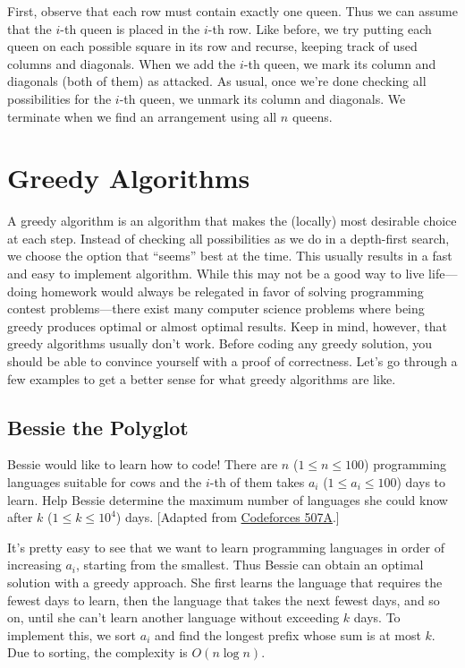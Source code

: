 First, observe that each row must contain exactly one queen. Thus we can assume that the $i$-th queen is placed in the $i$-th row. Like before, we try putting each queen on each possible square in its row and recurse, keeping track of used columns and diagonals. When we add the $i$-th queen, we mark its column and diagonals (both of them) as attacked. As usual, once we're done checking all possibilities for the $i$-th queen, we unmark its column and diagonals. We terminate when we find an arrangement using all $n$ queens.

\section{Greedy Algorithms}

A greedy algorithm is an algorithm that makes the (locally) most desirable choice at each step. Instead of checking all possibilities as we do in a depth-first search, we choose the option that ``seems'' best at the time. This usually results in a fast and easy to implement algorithm. While this may not be a good way to live life---doing homework would always be relegated in favor of solving programming contest problems---there exist many computer science problems where being greedy produces optimal or almost optimal results. Keep in mind, however, that greedy algorithms usually don't work. Before coding any greedy solution, you should be able to convince yourself with a proof of correctness. Let's go through a few examples to get a better sense for what greedy algorithms are like.

\subsection{Bessie the Polyglot}

\begin{typewriter}
  Bessie would like to learn how to code! There are $n$ ($1\le n\le 100$) programming languages suitable for cows and the $i$-th of them takes $a_i$ ($1\le a_i\le 100$) days to learn. Help Bessie determine the maximum number of languages she could know after $k$ ($1\le k\le 10^4$) days. [Adapted from \href{http://codeforces.com/problemset/problem/507/A}{Codeforces 507A}.]
\end{typewriter}

It's pretty easy to see that we want to learn programming languages in order of increasing $a_i$, starting from the smallest. Thus Bessie can obtain an optimal solution with a greedy approach. She first learns the language that requires the fewest days to learn, then the language that takes the next fewest days, and so on, until she can't learn another language without exceeding $k$ days. To implement this, we sort $a_i$ and find the longest prefix whose sum is at most $k$. Due to sorting, the complexity is $O(n\log n)$.

